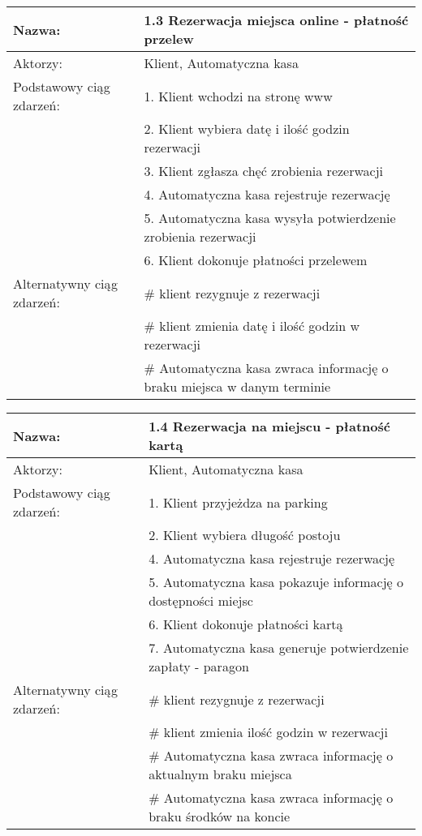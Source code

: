 \begin{center}
\vspace{1cm}

\begin{tabular}{|L{3cm}  L{13cm}|}
\hline
Nazwa: & 1.3 Rezerwacja miejsca online - płatność przelew \\ \hline
Aktorzy: & Klient,  Automatyczna kasa \\ \hline
Podstawowy ciąg zdarzeń: & 1. Klient wchodzi na stronę www \\
 & 2. Klient wybiera datę i ilość godzin rezerwacji \\
 & 3. Klient zgłasza chęć zrobienia rezerwacji \\
 & 4. Automatyczna kasa rejestruje rezerwację \\
 & 5. Automatyczna kasa wysyła potwierdzenie zrobienia rezerwacji \\
 & 6. Klient dokonuje płatności przelewem \\ \hline
Alternatywny ciąg zdarzeń:  & \# klient rezygnuje z rezerwacji \\
 & \# klient zmienia datę i ilość godzin w rezerwacji \\
 & \# Automatyczna kasa zwraca informację o braku miejsca w danym terminie\\ \hline
\end{tabular}

\vspace{1cm}

\begin{tabular}{|L{3cm}  L{13cm}|}
\hline
Nazwa: & 1.4 Rezerwacja na miejscu - płatność kartą \\ \hline
Aktorzy: & Klient,  Automatyczna kasa \\ \hline
Podstawowy ciąg zdarzeń: & 1. Klient przyjeżdza na parking \\
 & 2. Klient wybiera długość postoju \\
 & 4. Automatyczna kasa rejestruje rezerwację \\
 & 5. Automatyczna kasa pokazuje informację o dostępności miejsc \\
 & 6. Klient dokonuje płatności kartą \\
 & 7. Automatyczna kasa generuje potwierdzenie zapłaty - paragon \\ \hline
Alternatywny ciąg zdarzeń:  & \# klient rezygnuje z rezerwacji \\
 & \# klient zmienia ilość godzin w rezerwacji \\
 & \# Automatyczna kasa zwraca informację o aktualnym braku miejsca\\
 & \# Automatyczna kasa zwraca informację o braku środków na koncie \\ \hline
\end{tabular}


\end{center}
